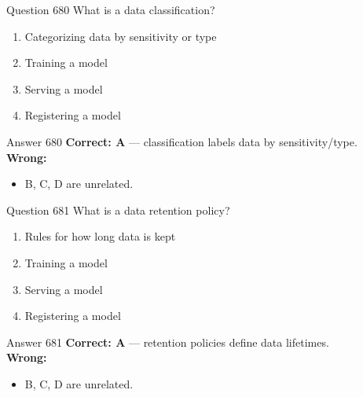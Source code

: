 \documentclass[aspectratio=169,11pt]{beamer}
\begin{document}
	\begin{frame}{Question 680}
		What is a data classification?
		\begin{enumerate}[label=\Alph*.]
			\item Categorizing data by sensitivity or type
			\item Training a model
			\item Serving a model
			\item Registering a model
		\end{enumerate}
	\end{frame}
	\begin{frame}{Answer 680}
		\textbf{Correct: A} --- classification labels data by sensitivity/type.\\
		\vspace{0.5em}
		\textbf{Wrong:}
		\begin{itemize}
			\item B, C, D are unrelated.
		\end{itemize}
	\end{frame}
	
	\begin{frame}{Question 681}
		What is a data retention policy?
		\begin{enumerate}[label=\Alph*.]
			\item Rules for how long data is kept
			\item Training a model
			\item Serving a model
			\item Registering a model
		\end{enumerate}
	\end{frame}
	\begin{frame}{Answer 681}
		\textbf{Correct: A} --- retention policies define data lifetimes.\\
		\vspace{0.5em}
		\textbf{Wrong:}
		\begin{itemize}
			\item B, C, D are unrelated.
		\end{itemize}
	\end{frame}
	
\end{document}
